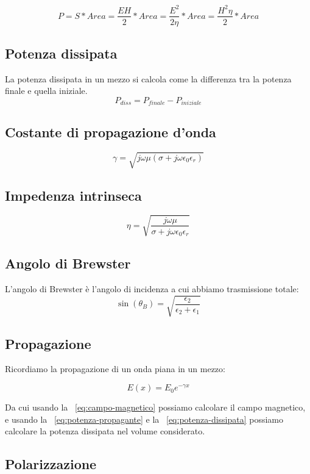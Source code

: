 \documentclass[10pt,a4paper]{report}
\begin{document}
		\begin{equation}
		P=S*Area=\frac{EH}{2}*Area=\frac{E^2}{2\eta}*Area=\frac{H^2\eta}{2}*Area
		\label{eq:potenza-propagante}
		\end{equation}
	
	\subsection{Potenza dissipata}

		La potenza dissipata in un mezzo si calcola come la differenza tra la potenza finale e quella iniziale.
		\begin{equation}
			P_{diss}=P_{finale}-P_{iniziale}
			\label{eq:potenza-dissipata}
		\end{equation}
	
	\subsection{Costante di propagazione d'onda}
		\[
		\gamma=\sqrt{j\omega\mu(\sigma+j\omega\epsilon_0\epsilon_r)}
		\]
	\subsection{Impedenza intrinseca}
		\[
		\eta=\sqrt{\frac{j\omega\mu}{\sigma+j\omega\epsilon_0\epsilon_r}}
		\]
		

	\subsection{Angolo di Brewster}

	L'angolo di Brewster è l'angolo di incidenza a cui abbiamo trasmissione totale:
	\[
	\sin(\theta_B)=\sqrt{\frac{\epsilon_2}{\epsilon_2+\epsilon_1}}
	\label{eq:brewster}
	\]




	\subsection{Propagazione}
	Ricordiamo la propagazione di un onda piana in un mezzo:
	

	\[
	E(x)=E_0e^{-\gamma x}
	\]
	
	Da cui usando la ~\ref{eq:campo-magnetico} possiamo calcolare il campo magnetico, e usando la ~\ref{eq:potenza-propagante} e la ~\ref{eq:potenza-dissipata} possiamo calcolare la potenza dissipata nel volume considerato.


	\subsection{Polarizzazione}
\end{document}

